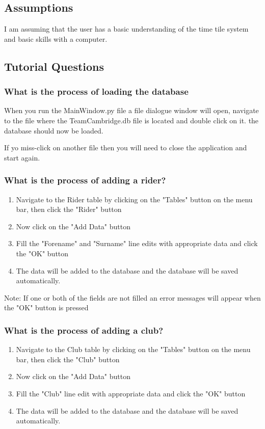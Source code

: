 \subsection{Assumptions}
I am assuming that the user has a basic understanding of the time tile system and basic skills with a computer.
\subsection{Tutorial Questions}

\subsubsection{What is the process of loading the database}
When you run the MainWindow.py file a file dialogue window will open, navigate to the file where the TeamCambridge.db file is located and double click on it. the database should now be loaded.

If yo miss-click on another file then you will need to close the application and start again.

\subsubsection{What is the process of adding a rider?}
\begin{enumerate}
\item Navigate to the Rider table by clicking on the "Tables" button on the menu bar, then click the "Rider" button
\item Now click on the "Add Data" button
\item Fill the "Forename" and "Surname" line edits with appropriate data and click the "OK" button
\item The data will be added to the database and the database will be saved automatically.
\end{enumerate}

Note: If one or both of the fields are not filled an error messages will appear when the "OK" button is pressed

\subsubsection{What is the process of adding a club?}
\begin{enumerate}
\item Navigate to the Club table by clicking on the "Tables" button on the menu bar, then click the "Club" button
\item Now click on the "Add Data" button
\item Fill the "Club" line edit with appropriate data and click the "OK" button
\item The data will be added to the database and the database will be saved automatically.
\end{enumerate}

